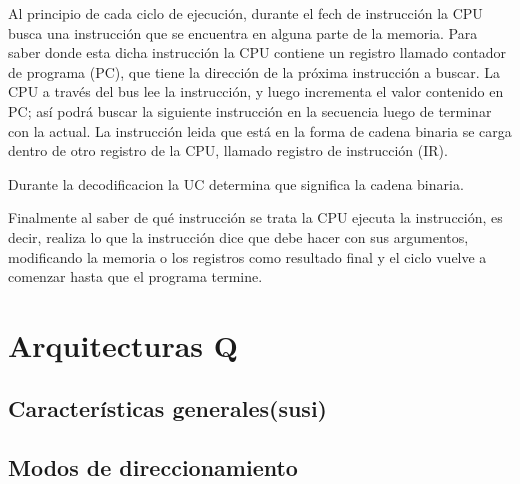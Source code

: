 Al principio de cada ciclo de ejecución, durante el fech de instrucción la CPU busca una instrucción que se encuentra en alguna parte de la memoria. Para saber donde esta dicha instrucción la CPU contiene un registro llamado contador de programa (PC), que tiene la dirección de la próxima instrucción a buscar. La CPU a través del bus lee la instrucción, y luego incrementa el valor contenido en PC; así podrá buscar la siguiente instrucción en la secuencia luego de terminar con la actual. La instrucción leida que está en la forma de cadena binaria se carga dentro de otro registro de la CPU, llamado registro de instrucción (IR).

Durante la decodificacion la UC determina que significa la cadena binaria.

Finalmente al saber de qué instrucción se trata la CPU ejecuta la instrucción, es decir, realiza lo que la instrucción dice que debe hacer con sus argumentos, modificando la memoria o los registros como resultado final y el ciclo vuelve a comenzar hasta que el programa termine.

\section{Arquitecturas Q}

\subsection{Características generales(susi)} \label{caracteristicasQ}

\subsection{Modos de direccionamiento}

